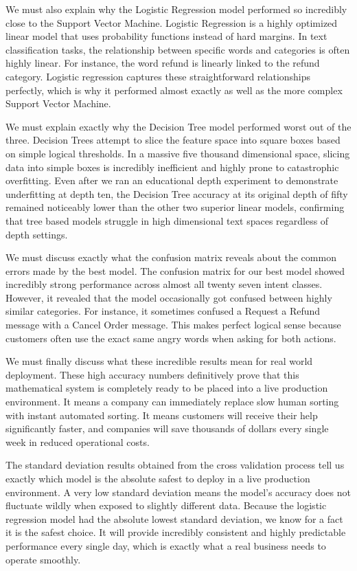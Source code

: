 \documentclass[12pt]{article}
\begin{document}
We must also explain why the Logistic Regression model performed so incredibly close to the Support Vector Machine. Logistic Regression is a highly optimized linear model that uses probability functions instead of hard margins. In text classification tasks, the relationship between specific words and categories is often highly linear. For instance, the word refund is linearly linked to the refund category. Logistic regression captures these straightforward relationships perfectly, which is why it performed almost exactly as well as the more complex Support Vector Machine. 

We must explain exactly why the Decision Tree model performed worst out of the three. Decision Trees attempt to slice the feature space into square boxes based on simple logical thresholds. In a massive five thousand dimensional space, slicing data into simple boxes is incredibly inefficient and highly prone to catastrophic overfitting. Even after we ran an educational depth experiment to demonstrate underfitting at depth ten, the Decision Tree accuracy at its original depth of fifty remained noticeably lower than the other two superior linear models, confirming that tree based models struggle in high dimensional text spaces regardless of depth settings. 

We must discuss exactly what the confusion matrix reveals about the common errors made by the best model. The confusion matrix for our best model showed incredibly strong performance across almost all twenty seven intent classes. However, it revealed that the model occasionally got confused between highly similar categories. For instance, it sometimes confused a Request a Refund message with a Cancel Order message. This makes perfect logical sense because customers often use the exact same angry words when asking for both actions. 

We must finally discuss what these incredible results mean for real world deployment. These high accuracy numbers definitively prove that this mathematical system is completely ready to be placed into a live production environment. It means a company can immediately replace slow human sorting with instant automated sorting. It means customers will receive their help significantly faster, and companies will save thousands of dollars every single week in reduced operational costs.


The standard deviation results obtained from the cross validation process tell us exactly which model is the absolute safest to deploy in a live production environment. A very low standard deviation means the model's accuracy does not fluctuate wildly when exposed to slightly different data. Because the logistic regression model had the absolute lowest standard deviation, we know for a fact it is the safest choice. It will provide incredibly consistent and highly predictable performance every single day, which is exactly what a real business needs to operate smoothly.
\end{document}
